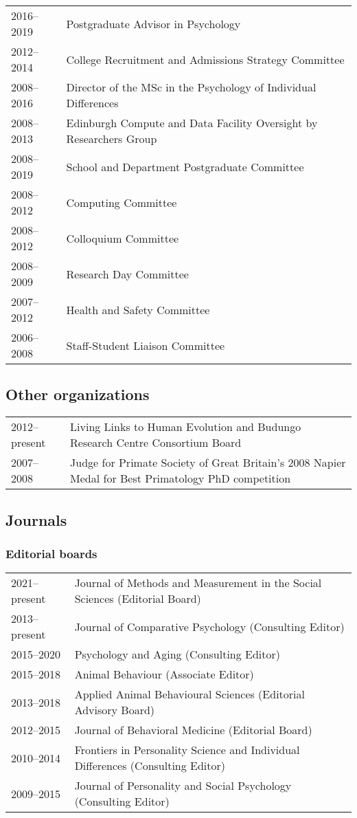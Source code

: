 \documentclass[11pt]{article}
\begin{document}
\begin{tabular}{p{3cm}p{12cm}}
2016--2019 & Postgraduate Advisor in Psychology \\
2012--2014 & College Recruitment and Admissions Strategy Committee \\
2008--2016 & Director of the MSc in the Psychology of Individual
Differences \\
2008--2013 & Edinburgh Compute and Data Facility Oversight by
Researchers Group \\
2008--2019 & School and Department Postgraduate Committee \\
2008--2012 & Computing Committee \\
2008--2012 & Colloquium Committee \\
2008--2009 & Research Day Committee \\
2007--2012 & Health and Safety Committee \\
2006--2008 & Staff-Student Liaison Committee
\end{tabular}

\subsection*{Other organizations}

\begin{tabular}{p{3cm}p{12cm}}
2012--present & Living Links to Human Evolution and Budungo Research
Centre Consortium Board \\
2007--2008 & Judge for Primate Society of Great Britain's 2008 Napier Medal
for Best Primatology PhD competition
\end{tabular}

\subsection*{Journals}

\subsubsection*{Editorial boards}

\begin{tabular}{p{3cm}p{12cm}}
2021--present & Journal of Methods and Measurement in the Social Sciences (Editorial Board) \\
2013--present & Journal of Comparative Psychology (Consulting Editor) \\
2015--2020 & Psychology and Aging (Consulting Editor) \\
2015--2018 & Animal Behaviour (Associate Editor) \\
2013--2018 & Applied Animal Behavioural Sciences (Editorial Advisory Board) \\
2012--2015 & Journal of Behavioral Medicine (Editorial Board) \\
2010--2014 & Frontiers in Personality Science and Individual
Differences (Consulting Editor) \\
2009--2015 & Journal of Personality and Social Psychology (Consulting Editor)
\end{tabular}
\end{document}
